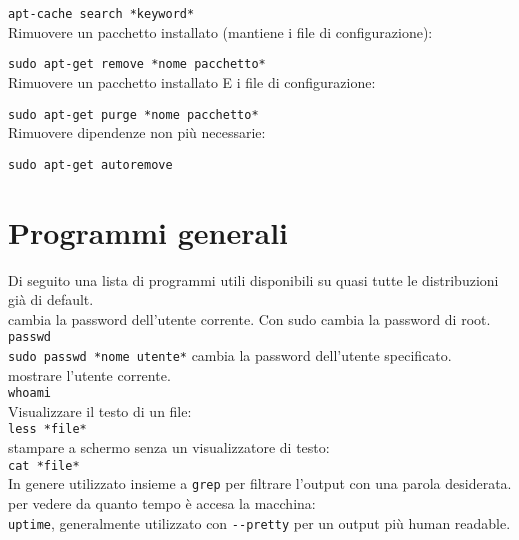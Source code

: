 \documentclass[]{report}
\begin{document}
\verb|apt-cache search *keyword*|\\

\noindent Rimuovere un pacchetto installato (mantiene i file di configurazione):

\verb|sudo apt-get remove *nome pacchetto*|\\

\noindent Rimuovere un pacchetto installato E i file di configurazione:

\verb|sudo apt-get purge *nome pacchetto*|\\

\noindent Rimuovere dipendenze non più necessarie:

\verb|sudo apt-get autoremove|\\

\noindent 
\newpage

\section{Programmi generali}

Di seguito una lista di programmi utili disponibili su quasi tutte le distribuzioni già di default.\\

\noindent cambia la password dell'utente corrente. Con sudo cambia la password di root.\\

\noindent \verb|passwd| \\

\noindent \verb|sudo passwd *nome utente*| cambia la password dell'utente specificato.\\

\noindent mostrare l'utente corrente.\\
\noindent \verb|whoami| \\

\noindent Visualizzare il testo di un file:\\
\noindent \verb|less *file*|\\

\noindent stampare a schermo senza un visualizzatore di testo:\\
\noindent \verb|cat *file*|\\
In genere utilizzato insieme a \verb|grep| per filtrare l'output con una parola desiderata.\\

\noindent per vedere da quanto tempo è accesa la macchina:\\
\noindent \verb|uptime|, generalmente utilizzato con \verb|--pretty| per un output più human readable.\\
\end{document}
